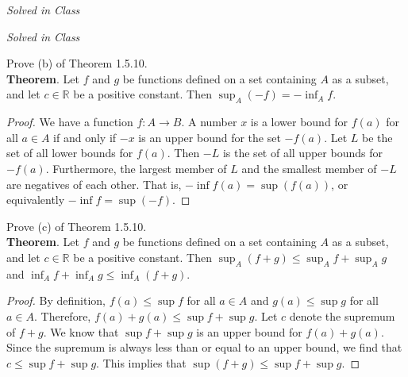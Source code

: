\documentclass[12pt]{book}
\newenvironment{exercise}[2][Exercise]{\begin{trivlist}
\item[\hskip \labelsep {\bfseries #1}\hskip \labelsep {\bfseries #2.}]}{\end{trivlist}}
\begin{document}
\begin{exercise}{1.5.8}
\emph{Solved in Class}
\end{exercise}

\begin{exercise}{1.5.9}
\emph{Solved in Class}
\end{exercise}

\begin{exercise}{1.5.11}
Prove (b) of Theorem 1.5.10. \\

\textbf{Theorem}. Let $f$ and $g$ be functions defined on a set containing $A$ as a subset, and let $c \in \mathbb{R}$ be a positive constant. Then $\sup_A (-f) = - \inf_A f$.

	\begin{proof}
	We have a function $f: A \to B$. A number $x$ is a lower bound for $f(a)$ for all $a \in A$ if and only if $-x$ is an upper bound for the set $-f(a)$. Let  $L$ be the set of all lower bounds for $f(a)$. Then $-L$ is the set of all upper bounds for $-f(a)$. Furthermore, the largest member of $L$ and the smallest member of $-L$ are negatives of each other. That is, $- \inf f(a) = \sup (f(a))$, or equivalently $- \inf f = \sup (-f)$.  
	\end{proof}
\end{exercise}

\begin{exercise}{1.5.12}
Prove (c) of Theorem 1.5.10.\\

\textbf{Theorem}. Let $f$ and $g$ be functions defined on a set containing $A$ as a subset, and let $c \in \mathbb{R}$ be a positive constant. Then $\sup_A (f+g) \leq \sup_A f + \sup_A g $ and $\inf_A f + \inf_A g \leq \inf_A (f+g)$.

	\begin{proof}
	By definition, $f(a) \leq \sup f$ for all $a \in A$ and $g(a) \leq \sup g$ for all $a \in A$. Therefore, $f(a)+g(a) \leq \sup f + \sup g$. Let $c$ denote the supremum of $f+g$. We know that $\sup f + \sup g$ is an upper bound  for $f(a)+g(a)$. Since the supremum is always less than or equal to an upper bound, we find that $c \leq \sup f + \sup g$. This implies that $\sup (f+g) \leq \sup f + \sup g$.
	\end{proof}
\end{exercise}
\end{document}
